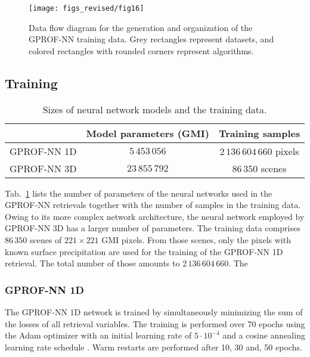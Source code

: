 \documentclass[journal abbreviation, manuscript]{copernicus}
\begin{document}
\begin{figure}
  \centering
  \texttt{[image: figs\_revised/fig16]}
  \caption{
    Data flow diagram for the generation and organization of the GPROF-NN training data. Grey rectangles represent datasets, and colored rectangles with rounded corners represent algorithms.
  }
  \label{fig:data_flow}
\end{figure}

\subsection{Training}     %
\label{sec:gprof_nn_training}

\begin{table}
  \caption{Sizes of neural network models and the training data.}
  \label{tab:parameters}
  \begin{tabular}{|l||cc|}
    \hline
    & Model parameters (GMI) &  Training samples \\
    \hline
    \hline
    GPROF-NN 1D & $5\,453\,056$ &  $2\,136\,604\,660$ pixels \\
    \hline
    GPROF-NN 3D & $23\,855\,792$ &  $86\,350$ scenes \\
    \hline
  \end{tabular}
\end{table}

Tab.~\ref{tab:parameters} lists the number of parameters of the neural networks
used in the GPROF-NN retrievals together with the number of samples in the
training data. Owing to its more complex network architecture, the neural
network employed by GPROF-NN 3D has a larger number of parameters. The training
data comprises $86\,350$ scenes of $221\times 221$ GMI pixels. From those
scenes, only the pixels with known surface precipitation are used for the
training of the GPROF-NN 1D retrieval. The total number of those amounts to
$2\,136\,604\,660$. The

\subsubsection{GPROF-NN 1D}

The GPROF-NN 1D network is trained by simultaneously minimizing the sum of the
losses of all retrieval variables. The training is performed over 70 epochs
using the Adam optimizer \citep{kingma14} with an initial learning rate of
$5\cdot10^{-4}$ and a cosine annealing learning rate schedule
\citep{loshchilov16}. Warm restarts are performed after 10, 30 and, 50 epochs.
\end{document}
